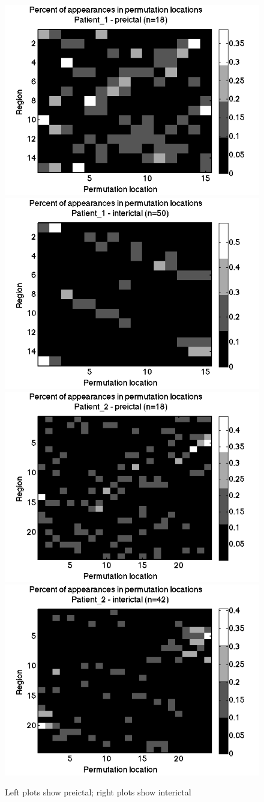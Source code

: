 \documentclass[11pt]{article}
\begin{document}
\begin{figure}[H]
\centering
\includegraphics[width=.35\textwidth]{pictures/permLocPre_Patient_1.png}
\includegraphics[width=.35\textwidth]{pictures/permLocInter_Patient_1.png}
\includegraphics[width=.35\textwidth]{pictures/permLocPre_Patient_2.png}
\includegraphics[width=.35\textwidth]{pictures/permLocInter_Patient_2.png}
\caption{Left plots show preictal; right plots show interictal}
\end{figure}
\end{document}

